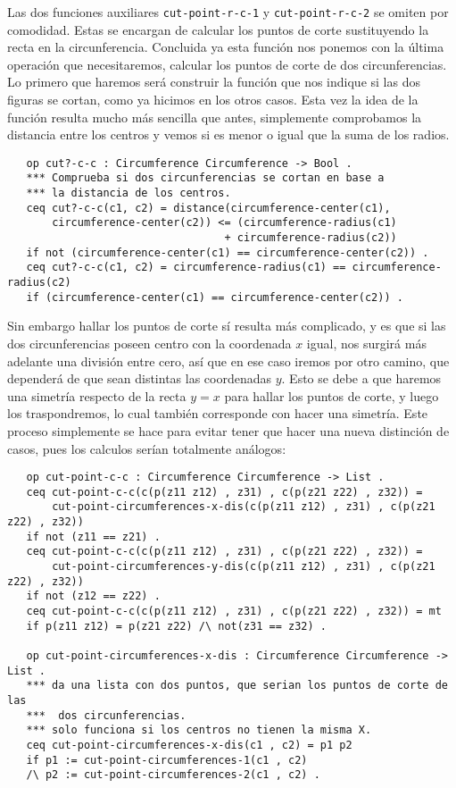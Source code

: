 Las dos funciones auxiliares \texttt{cut-point-r-c-1} y \texttt{cut-point-r-c-2} se omiten por comodidad. Estas se encargan de calcular los puntos de corte sustituyendo la recta en la circunferencia. Concluida ya esta función nos ponemos con la última operación que necesitaremos, calcular los puntos de corte de dos circunferencias. Lo primero que haremos será construir la función que nos indique si las dos figuras se cortan, como ya hicimos en los otros casos. Esta vez la idea de la función resulta mucho más sencilla que antes, simplemente comprobamos la distancia entre los centros y vemos si es menor o igual que la suma de los radios. \par
{\codesize
\begin{verbatim}
   op cut?-c-c : Circumference Circumference -> Bool .
   *** Comprueba si dos circunferencias se cortan en base a 
   *** la distancia de los centros.
   ceq cut?-c-c(c1, c2) = distance(circumference-center(c1), 
       circumference-center(c2)) <= (circumference-radius(c1) 
                                  + circumference-radius(c2))
   if not (circumference-center(c1) == circumference-center(c2)) . 
   ceq cut?-c-c(c1, c2) = circumference-radius(c1) == circumference-radius(c2)
   if (circumference-center(c1) == circumference-center(c2)) .
\end{verbatim}
}

Sin embargo hallar los puntos de corte sí resulta más complicado, y es que si las dos circunferencias poseen centro con la coordenada $x$ igual, nos surgirá más adelante una división entre cero, así que en ese caso iremos por otro camino, que dependerá de que sean distintas las coordenadas $y$. Esto se debe a que haremos una simetría respecto de la recta $y = x$ para hallar los puntos de corte, y luego los traspondremos, lo cual también corresponde con hacer una simetría. Este proceso simplemente se hace para evitar tener que hacer una nueva distinción de casos, pues los calculos serían totalmente análogos: \par
{\codesize
\begin{verbatim}
   op cut-point-c-c : Circumference Circumference -> List .
   ceq cut-point-c-c(c(p(z11 z12) , z31) , c(p(z21 z22) , z32)) = 
       cut-point-circumferences-x-dis(c(p(z11 z12) , z31) , c(p(z21 z22) , z32)) 
   if not (z11 == z21) .
   ceq cut-point-c-c(c(p(z11 z12) , z31) , c(p(z21 z22) , z32)) = 
       cut-point-circumferences-y-dis(c(p(z11 z12) , z31) , c(p(z21 z22) , z32))
   if not (z12 == z22) .
   ceq cut-point-c-c(c(p(z11 z12) , z31) , c(p(z21 z22) , z32)) = mt 
   if p(z11 z12) = p(z21 z22) /\ not(z31 == z32) .

   op cut-point-circumferences-x-dis : Circumference Circumference -> List .
   *** da una lista con dos puntos, que serian los puntos de corte de las
   ***  dos circunferencias.
   *** solo funciona si los centros no tienen la misma X.
   ceq cut-point-circumferences-x-dis(c1 , c2) = p1 p2
   if p1 := cut-point-circumferences-1(c1 , c2) 
   /\ p2 := cut-point-circumferences-2(c1 , c2) .
\end{verbatim}
}

